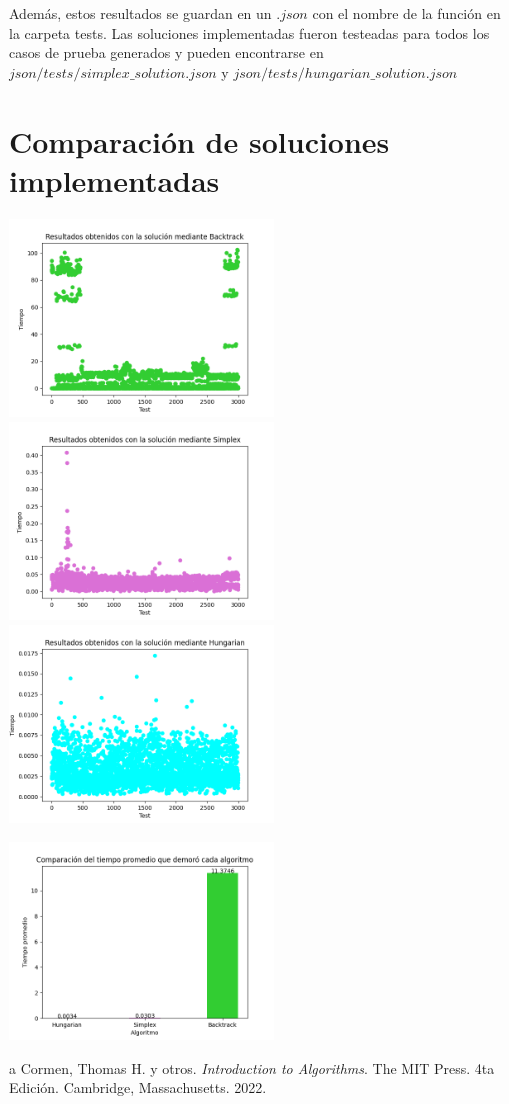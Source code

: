 \documentclass[10pt]{article} %
\begin{document}
 	 Adem\'as, estos resultados se guardan en un $ .json $ con el nombre de la funci\'on en la carpeta tests. Las soluciones implementadas fueron testeadas para todos los casos de prueba generados y pueden encontrarse en $ json/tests/simplex\_solution.json $ y $ json/tests/hungarian\_solution.json $
	
	\section{Comparaci\'on de soluciones implementadas}
	
	\begin{center}
		\includegraphics[width=7cm]{Backtrack_results.png}\\
		\includegraphics[width=7cm]{Simplex_results.png}
		\includegraphics[width=7cm]{Hungarian_results.png}
	\end{center}

	\begin{center}
		\includegraphics[width=7cm]{Bar_comparative_plot.png}
	\end{center}

	\begin{thebibliography}
		a
		 Cormen, Thomas H. y otros. \emph{Introduction to Algorithms}. 
		The MIT Press.
		4ta Edici\'on.		
		Cambridge, Massachusetts.
		2022.
	\end{thebibliography}
\end{document}
